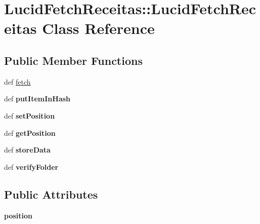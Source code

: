 \hypertarget{classLucidFetchReceitas_1_1LucidFetchReceitas}{
\section{LucidFetchReceitas::LucidFetchReceitas Class Reference}
\label{classLucidFetchReceitas_1_1LucidFetchReceitas}
}
\subsection*{Public Member Functions}
\begin{DoxyCompactItemize}
\item 
def \hyperlink{classLucidFetchReceitas_1_1LucidFetchReceitas_ae9a10ef27856a0ef1e898a5820874f8e}{fetch}
\item 
\hypertarget{classLucidFetchReceitas_1_1LucidFetchReceitas_a350099e21da5e2280a3db25f86bd2356}{
def {\bfseries putItemInHash}}
\label{classLucidFetchReceitas_1_1LucidFetchReceitas_a350099e21da5e2280a3db25f86bd2356}

\item 
\hypertarget{classLucidFetchReceitas_1_1LucidFetchReceitas_a2469bf42882489bd731602096564d877}{
def {\bfseries setPosition}}
\label{classLucidFetchReceitas_1_1LucidFetchReceitas_a2469bf42882489bd731602096564d877}

\item 
\hypertarget{classLucidFetchReceitas_1_1LucidFetchReceitas_ab67ca3875cfc7633e8d1e63ae8cfe45d}{
def {\bfseries getPosition}}
\label{classLucidFetchReceitas_1_1LucidFetchReceitas_ab67ca3875cfc7633e8d1e63ae8cfe45d}

\item 
\hypertarget{classLucidFetchReceitas_1_1LucidFetchReceitas_acdc9d9d71744ef3660b7b5b9052372d3}{
def {\bfseries storeData}}
\label{classLucidFetchReceitas_1_1LucidFetchReceitas_acdc9d9d71744ef3660b7b5b9052372d3}

\item 
\hypertarget{classLucidFetchReceitas_1_1LucidFetchReceitas_a404c9595bca7b361c4e12bf5c2478c55}{
def {\bfseries verifyFolder}}
\label{classLucidFetchReceitas_1_1LucidFetchReceitas_a404c9595bca7b361c4e12bf5c2478c55}

\end{DoxyCompactItemize}
\subsection*{Public Attributes}
\begin{DoxyCompactItemize}
\item 
\hypertarget{classLucidFetchReceitas_1_1LucidFetchReceitas_a58b8064ebe2923db1b72127414808a03}{
{\bfseries position}}
\label{classLucidFetchReceitas_1_1LucidFetchReceitas_a58b8064ebe2923db1b72127414808a03}

\end{DoxyCompactItemize}
